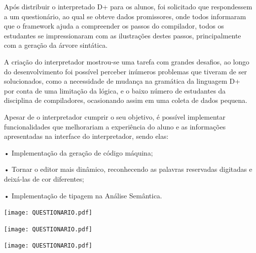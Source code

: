 \documentclass[12pt,oneside,a4paper,chapter=TITLE,section=TITLE,sumario=tradicional]{abntex2}
\begin{document}
Após distribuir o interpretado D+ para os alunos, foi solicitado que respondessem a um questionário, ao qual se obteve dados promissores, onde todos informaram que o framework ajuda a compreender os passos do compilador, todos os estudantes se impressionaram com as ilustrações destes passos, principalmente com a geração da árvore sintática.

A criação do interpretador mostrou-se uma tarefa com grandes desafios, ao longo do desenvolvimento foi possível perceber inúmeros problemas que tiveram de ser solucionados, como a necessidade de mudança na gramática da linguagem D+ por conta de uma limitação da lógica, e o baixo número de estudantes da disciplina de compiladores, ocasionando assim em uma coleta de dados pequena.

Apesar de o interpretador cumprir o seu objetivo, é possível implementar funcionalidades que melhorariam a experiência do aluno e as informações apresentadas na interface do interpretador, sendo elas:


•	Implementação da geração de código máquina;

•	Tornar o editor mais dinâmico, reconhecendo as palavras reservadas digitadas e deixá-las de cor diferentes;

•	Implementação de tipagem na Análise Semântica.





\texttt{[image: QUESTIONARIO.pdf]}

\texttt{[image: QUESTIONARIO.pdf]}

\texttt{[image: QUESTIONARIO.pdf]}

\begin{figure}[htb]
\end{figure}
\end{document}
